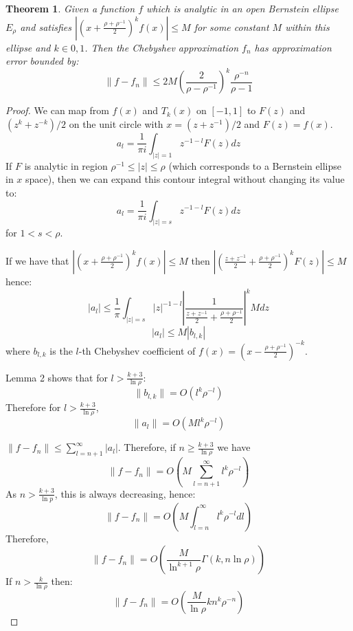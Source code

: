 \documentclass[aps]{revtex4-2}
\newtheorem{theorem}{Theorem}
\begin{document}
\begin{theorem}
Given a function $f$ which is analytic in an open Bernstein ellipse $E_{\rho}$ and satisfies $|(x+\frac{\rho + \rho^{-1}}{2})^k f(x)| \leq M$ for some constant $M$ within this ellipse and $k \in {0,1}$. Then the Chebyshev approximation $f_n$ has approximation error bounded by:
\begin{equation}
        \|f-f_n\| \leq 2M\left(\frac{2}{\rho-\rho^{-1}}\right)^k \frac{\rho^{-n}}{\rho -1}
\end{equation}
\end{theorem}
\begin{proof}
We can map from $f(x)$ and $T_k(x)$ on $[-1,1]$ to $F(z)$ and $(z^k + z^{-k})/2$ on the unit circle with $x = (z + z^{-1})/2$ and $F(z) = f(x)$.
\begin{equation}
    a_l = \frac{1}{\pi i} \int_{|z|=1} z^{-1-l} F(z) dz
\end{equation}
If $F$ is analytic in region $\rho^{-1} \leq |z| \leq \rho$ (which corresponds to a Bernstein ellipse in $x$ space), then we can expand this contour integral without changing its value to:
\begin{equation}
    a_l = \frac{1}{\pi i} \int_{|z|=s} z^{-1-l} F(z) dz
\end{equation}
for $1<s< \rho$.

If we have that $|(x+\frac{\rho + \rho^{-1}}{2})^kf(x)| \leq M$ then $|(\frac{z + z^{-1}}{2}+\frac{\rho + \rho^{-1}}{2})^kF(z)| \leq M$ hence:
\begin{equation}
    |a_l| \leq \frac{1}{\pi} \int_{|z|=s} |z|^{-1-l}\left|\frac{1}{\frac{z + z^{-1}}{2}+\frac{\rho + \rho^{-1}}{2}}\right|^k M dz
\end{equation}
\begin{equation}
    |a_l| \leq M|b_{l,k}|
\end{equation}
where $b_{l,k}$ is the $l$-th Chebyshev coefficient of $f(x) = (x- \frac{\rho + \rho^{-1}}{2})^{-k}$.

Lemma 2 shows that for $l > \frac{k+3}{\ln \rho}$:
$$
 \|b_{l,k}\| = O(l^k\rho^{-l})
 $$
Therefore for $l > \frac{k+3}{\ln \rho}$,
$$
\| a_l \| = O(Ml^k\rho^{-l})
$$

$\|f-f_n\| \leq \sum_{l=n+1}^{\infty} |a_l|$. Therefore, if $n \geq \frac{k+3}{\ln \rho}$ we have
\begin{equation}
    \|f-f_n\| = O(M\sum_{l=n+1}^{\infty}l^k\rho^{-l})
\end{equation}
As $n>\frac{k+3}{\ln p}$, this is always decreasing, hence:
\begin{equation}
    \|f-f_n\| = O(M\int_{l=n}^{\infty}l^k\rho^{-l}dl)
\end{equation}
Therefore,
\begin{equation}
    \|f-f_n\| = O(\frac{M}{\ln^{k+1} \rho}\Gamma(k, n \ln \rho))
\end{equation}
If $n > \frac{k}{\ln \rho}$ then:
\begin{equation}
    \|f-f_n\| = O(\frac{M}{\ln \rho} k n^k \rho^{-n} )
\end{equation}

\end{proof}
\end{document}
